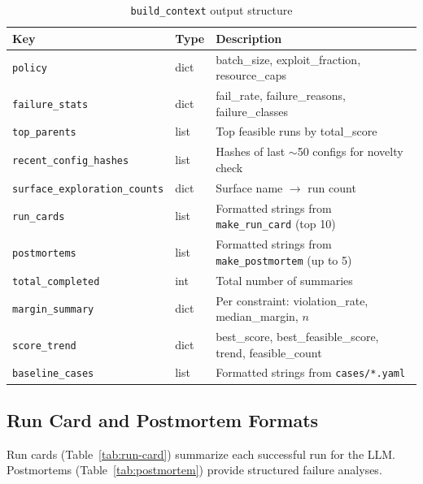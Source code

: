 \begin{table}[t]
  \centering
  \caption{\texttt{build\_context} output structure}
  \label{tab:context-payload}
  \begin{tabular}{@{}llp{6cm}@{}}
    \toprule
    \textbf{Key} & \textbf{Type} & \textbf{Description} \\
    \midrule
    \texttt{policy} & dict & batch\_size, exploit\_fraction, resource\_caps \\
    \texttt{failure\_stats} & dict & fail\_rate, failure\_reasons, failure\_classes \\
    \texttt{top\_parents} & list & Top feasible runs by total\_score \\
    \texttt{recent\_config\_hashes} & list & Hashes of last $\sim$50 configs for novelty check \\
    \texttt{surface\_exploration\_counts} & dict & Surface name $\to$ run count \\
    \texttt{run\_cards} & list & Formatted strings from \texttt{make\_run\_card} (top 10) \\
    \texttt{postmortems} & list & Formatted strings from \texttt{make\_postmortem} (up to 5) \\
    \texttt{total\_completed} & int & Total number of summaries \\
    \texttt{margin\_summary} & dict & Per constraint: violation\_rate, median\_margin, $n$ \\
    \texttt{score\_trend} & dict & best\_score, best\_feasible\_score, trend, feasible\_count \\
    \texttt{baseline\_cases} & list & Formatted strings from \texttt{cases/*.yaml} \\
    \bottomrule
  \end{tabular}
\end{table}

\subsection{Run Card and Postmortem Formats}

Run cards (Table~\ref{tab:run-card}) summarize each successful run for the LLM. Postmortems (Table~\ref{tab:postmortem}) provide structured failure analyses.

